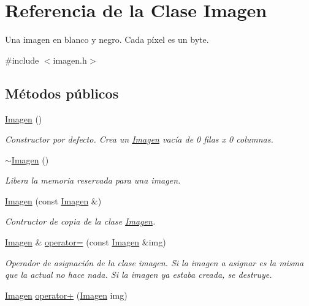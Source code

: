 \hypertarget{class_imagen}{}\section{Referencia de la Clase Imagen}
\label{class_imagen}


Una imagen en blanco y negro. Cada píxel es un byte.  




{\ttfamily \#include $<$imagen.\+h$>$}

\subsection*{Métodos públicos}
\begin{DoxyCompactItemize}
\item 
\hyperlink{class_imagen_ab2e649aa7a105155c7bfdb846abf0528}{Imagen} ()
\begin{DoxyCompactList}\small\item\em Constructor por defecto. Crea un \hyperlink{class_imagen}{Imagen} vacía de 0 filas x 0 columnas. \end{DoxyCompactList}\item 
\hyperlink{class_imagen_a03dd93c9cf920a9dc0b72f8bd34f2e8a}{$\sim$\+Imagen} ()
\begin{DoxyCompactList}\small\item\em Libera la memoria reservada para una imagen. \end{DoxyCompactList}\item 
\hyperlink{class_imagen_ac21b1c758a32e6c43315b9f46caf673e}{Imagen} (const \hyperlink{class_imagen}{Imagen} \&)
\begin{DoxyCompactList}\small\item\em Contructor de copia de la clase \hyperlink{class_imagen}{Imagen}. \end{DoxyCompactList}\item 
\hyperlink{class_imagen}{Imagen} \& \hyperlink{class_imagen_a43d10ec74966d22e5477f686462802dc}{operator=} (const \hyperlink{class_imagen}{Imagen} \&img)
\begin{DoxyCompactList}\small\item\em Operador de asignación de la clase imagen. Si la imagen a asignar es la misma que la actual no hace nada. Si la imagen ya estaba creada, se destruye. \end{DoxyCompactList}\item 
\hyperlink{class_imagen}{Imagen} \hyperlink{class_imagen_afc8f4a032d37f2012f1175599f81d60b}{operator+} (\hyperlink{class_imagen}{Imagen} img)

\end{DoxyCompactItemize}
